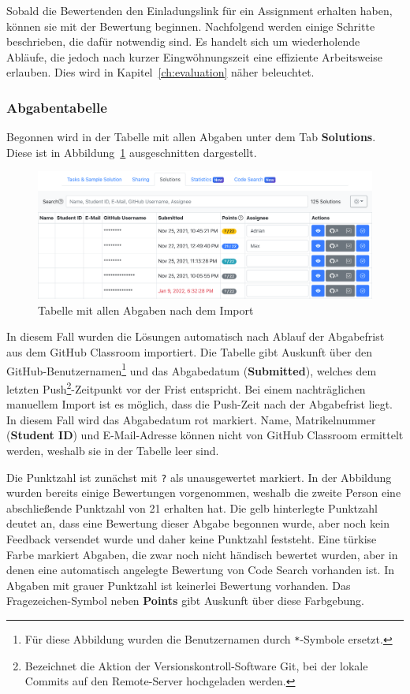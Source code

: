 Sobald die Bewertenden den Einladungslink für ein Assignment erhalten haben, können sie mit der Bewertung beginnen.
Nachfolgend werden einige Schritte beschrieben, die dafür notwendig sind.
Es handelt sich um wiederholende Abläufe, die jedoch nach kurzer Eingwöhnungszeit eine effiziente Arbeitsweise erlauben.
Dies wird in Kapitel~\ref{ch:evaluation} näher beleuchtet.

\subsubsection{Abgabentabelle}

Begonnen wird in der Tabelle mit allen Abgaben unter dem Tab \textbf{Solutions}.
Diese ist in Abbildung~\ref{fig:assignment-solutions-table} ausgeschnitten dargestellt.

\begin{figure}
    \centering
    \includegraphics[width=\textwidth]{images/assignment-solutions-table}
    \caption{Tabelle mit allen Abgaben nach dem Import}
    \label{fig:assignment-solutions-table}
\end{figure}

In diesem Fall wurden die Lösungen automatisch nach Ablauf der Abgabefrist aus dem GitHub Classroom importiert.
Die Tabelle gibt Auskunft über den GitHub-Benutzernamen\footnote{Für diese Abbildung wurden die Benutzernamen durch \texttt{*}-Symbole ersetzt.} und das Abgabedatum (\textbf{Submitted}), welches dem letzten Push\footnote{Bezeichnet die Aktion der Versionskontroll-Software Git, bei der lokale Commits auf den Remote-Server hochgeladen werden.}-Zeitpunkt vor der Frist entspricht.
Bei einem nachträglichen manuellem Import ist es möglich, dass die Push-Zeit nach der Abgabefrist liegt.
In diesem Fall wird das Abgabedatum rot markiert.
Name, Matrikelnummer (\textbf{Student ID}) und E-Mail-Adresse können nicht von GitHub Classroom ermittelt werden, weshalb sie in der Tabelle leer sind.

Die Punktzahl ist zunächst mit \texttt{?} als unausgewertet markiert.
In der Abbildung wurden bereits einige Bewertungen vorgenommen, weshalb die zweite Person eine abschließende Punktzahl von 21 erhalten hat.
Die gelb hinterlegte Punktzahl deutet an, dass eine Bewertung dieser Abgabe begonnen wurde, aber noch kein Feedback versendet wurde und daher keine Punktzahl feststeht.
Eine türkise Farbe markiert Abgaben, die zwar noch nicht händisch bewertet wurden, aber in denen eine automatisch angelegte Bewertung von Code Search vorhanden ist.
In Abgaben mit grauer Punktzahl ist keinerlei Bewertung vorhanden.
Das Fragezeichen-Symbol neben \textbf{Points} gibt Auskunft über diese Farbgebung.

